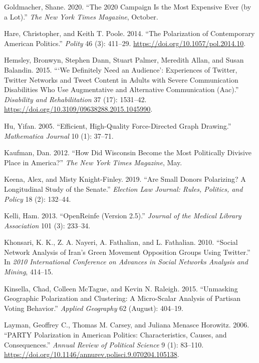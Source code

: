 \documentclass[12pt,]{article}
\begin{document}
\leavevmode\hypertarget{ref-goldmacher2020}{}%
Goldmacher, Shane. 2020. ``The 2020 Campaign Is the Most Expensive Ever
(by a Lot).'' \emph{The New York Times Magazine}, October.

\leavevmode\hypertarget{ref-hare2014}{}%
Hare, Christopher, and Keith T. Poole. 2014. ``The Polarization of
Contemporary American Politics.'' \emph{Polity} 46 (3): 411--29.
\url{https://doi.org/10.1057/pol.2014.10}.

\leavevmode\hypertarget{ref-hemsley2015}{}%
Hemsley, Bronwyn, Stephen Dann, Stuart Palmer, Meredith Allan, and Susan
Balandin. 2015. ```We Definitely Need an Audience': Experiences of
Twitter, Twitter Networks and Tweet Content in Adults with Severe
Communication Disabilities Who Use Augmentative and Alternative
Communication (Aac).'' \emph{Disability and Rehabilitation} 37 (17):
1531--42. \url{https://doi.org/10.3109/09638288.2015.1045990}.

\leavevmode\hypertarget{ref-yifanhu}{}%
Hu, Yifan. 2005. ``Efficient, High-Quality Force-Directed Graph
Drawing.'' \emph{Mathematica Journal} 10 (1): 37--71.

\leavevmode\hypertarget{ref-kaufman2012}{}%
Kaufman, Dan. 2012. ``How Did Wisconsin Become the Most Politically
Divisive Place in America?'' \emph{The New York Times Magazine}, May.

\leavevmode\hypertarget{ref-keena2019}{}%
Keena, Alex, and Misty Knight-Finley. 2019. ``Are Small Donors
Polarizing? A Longitudinal Study of the Senate.'' \emph{Election Law
Journal: Rules, Politics, and Policy} 18 (2): 132--44.

\leavevmode\hypertarget{ref-openrefine}{}%
Kelli, Ham. 2013. ``OpenReinfe (Version 2.5).'' \emph{Journal of the
Medical Library Association} 101 (3): 233--34.

\leavevmode\hypertarget{ref-khonsari2010}{}%
Khonsari, K. K., Z. A. Nayeri, A. Fathalian, and L. Fathalian. 2010.
``Social Network Analysis of Iran's Green Movement Opposition Groups
Using Twitter.'' In \emph{2010 International Conference on Advances in
Social Networks Analysis and Mining}, 414--15.

\leavevmode\hypertarget{ref-kinsella2015}{}%
Kinsella, Chad, Colleen McTague, and Kevin N. Raleigh. 2015. ``Unmasking
Geographic Polarization and Clustering: A Micro-Scalar Analysis of
Partisan Voting Behavior.'' \emph{Applied Geography} 62 (August):
404--19.

\leavevmode\hypertarget{ref-layman2006}{}%
Layman, Geoffrey C., Thomas M. Carsey, and Juliana Menasce Horowitz.
2006. ``PARTY Polarization in American Politics: Characteristics,
Causes, and Consequences.'' \emph{Annual Review of Political Science} 9
(1): 83--110.
\url{https://doi.org/10.1146/annurev.polisci.9.070204.105138}.
\end{document}
